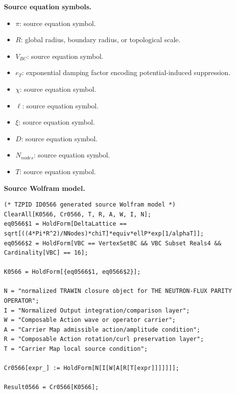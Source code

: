 \begin{minipage}[t]{0.49\linewidth}
\begingroup
\small
\raggedright
\textbf{Source equation symbols.}\par
\begin{itemize}[leftmargin=1.35em,itemsep=1pt,topsep=1pt,parsep=0pt]
    \item $\pi$: source equation symbol.
    \item $R$: global radius, boundary radius, or topological scale.
    \item $V_{BC}$: source equation symbol.
    \item $e_T$: exponential damping factor encoding potential-induced suppression.
    \item $\chi$: source equation symbol.
    \item $\ell$: source equation symbol.
    \item $\xi$: source equation symbol.
    \item $D$: source equation symbol.
    \item $N_{nodes}$: source equation symbol.
    \item $T$: source equation symbol.
\end{itemize}
\endgroup
\end{minipage}\hfill
\begin{minipage}[t]{0.47\linewidth}
\begingroup
\scriptsize
\raggedright
\textbf{Source Wolfram model.}\par
\begin{Verbatim}[fontsize=\tiny,breaklines=true,breakanywhere=true]
(* TZPID ID0566 generated source Wolfram model *)
ClearAll[K0566, Cr0566, T, R, A, W, I, N];
eq0566$1 = HoldForm[DeltaLattice == sqrt[((4*Pi*R^2)/NNodes)*chiT]*equiv*ellP*exp[1/alphaT]];
eq0566$2 = HoldForm[VBC == VertexSetBC && VBC Subset Reals4 && Cardinality[VBC] == 16];

K0566 = HoldForm[{eq0566$1, eq0566$2}];

N = "normalized TRAWIN closure object for THE NEUTRON-FLUX PARITY OPERATOR";
I = "Normalized Output integration/comparison layer";
W = "Composable Action wave or operator carrier";
A = "Carrier Map admissible action/amplitude condition";
R = "Composable Action rotation/curl preservation layer";
T = "Carrier Map local source condition";

Cr0566[expr_] := HoldForm[N[I[W[A[R[T[expr]]]]]]];

Result0566 = Cr0566[K0566];
\end{Verbatim}
\endgroup
\end{minipage}

